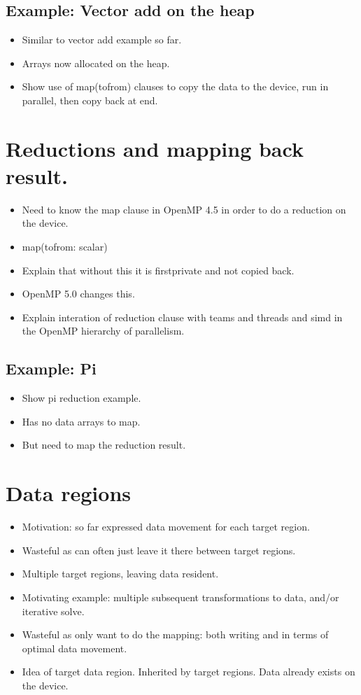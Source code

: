 \subsection{Example: Vector add on the heap}
\begin{itemize}
  \item Similar to vector add example so far.
  \item Arrays now allocated on the heap.
  \item Show use of map(tofrom) clauses to copy the data to the device, run in parallel, then copy back at end.
\end{itemize}

\section{Reductions and mapping back result.}
\begin{itemize}
  \item Need to know the map clause in OpenMP 4.5 in order to do a reduction on the device.
  \item map(tofrom: scalar)
  \item Explain that without this it is firstprivate and not copied back.
  \item OpenMP 5.0 changes this.
  \item Explain interation of reduction clause with teams and threads and simd in the OpenMP hierarchy of parallelism.
\end{itemize}

\subsection{Example: Pi}
\begin{itemize}
  \item Show pi reduction example.
  \item Has no data arrays to map.
  \item But need to map the reduction result.
\end{itemize}

\section{Data regions}
\begin{itemize}
  \item Motivation: so far expressed data movement for each target region.
  \item Wasteful as can often just leave it there between target regions.
  \item Multiple target regions, leaving data resident.
  \item Motivating example: multiple subsequent transformations to data, and/or iterative solve.
  \item Wasteful as only want to do the mapping: both writing and in terms of optimal data movement.
  \item Idea of target data region. Inherited by target regions. Data already exists on the device.
\end{itemize}

